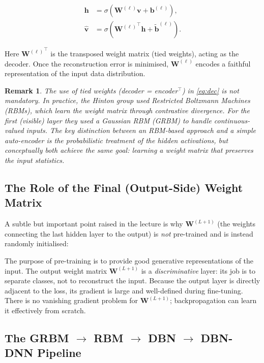 \documentclass[12pt,a4paper]{article}
\newtheorem{remark}{Remark}[section]
\newcommand{\W}{\mathbf{W}}
\newcommand{\h}{\mathbf{h}}
\begin{document}
\begin{align}
  \h &= \sigma\!\left(\W^{(\ell)}\mathbf{v} + \mathbf{b}^{(\ell)}\right),
       \label{eq:enc} \\
  \hat{\mathbf{v}} &= \sigma\!\left({\W^{(\ell)}}^{\!\top}\h + \tilde{\mathbf{b}}^{(\ell)}\right).
       \label{eq:dec}
\end{align}

Here ${\W^{(\ell)}}^{\!\top}$ is the transposed weight matrix (tied weights),
acting as the decoder.  Once the reconstruction error is minimised, $\W^{(\ell)}$
encodes a faithful representation of the input data distribution.

\begin{remark}
  The use of tied weights (decoder = encoder$^\top$) in \cref{eq:dec} is not
  mandatory.  In practice, the Hinton group used Restricted Boltzmann Machines
  (RBMs), which learn the weight matrix through contrastive divergence.  For
  the first (visible) layer they used a \emph{Gaussian} RBM (GRBM) to handle
  continuous-valued inputs.  The key distinction between an RBM-based approach
  and a simple auto-encoder is the probabilistic treatment of the hidden
  activations, but conceptually both achieve the same goal: learning a weight
  matrix that preserves the input statistics.
\end{remark}

\subsection{The Role of the Final (Output-Side) Weight Matrix}

A subtle but important point raised in the lecture is why $\W^{(L+1)}$
(the weights connecting the last hidden layer to the output) is \emph{not}
pre-trained and is instead randomly initialised:

\begin{keyinsight}[title=Why $\W^{(L+1)}$ is Randomly Initialised]
  The purpose of pre-training is to provide good generative representations of
  the input.  The output weight matrix $\W^{(L+1)}$ is a \emph{discriminative}
  layer: its job is to separate classes, not to reconstruct the input.
  Because the output layer is directly adjacent to the loss, its gradient is
  large and well-defined during fine-tuning.  There is no vanishing gradient
  problem for $\W^{(L+1)}$; backpropagation can learn it effectively from
  scratch.
\end{keyinsight}

\subsection{The GRBM $\rightarrow$ RBM $\rightarrow$ DBN $\rightarrow$ DBN-DNN Pipeline}
\end{document}
